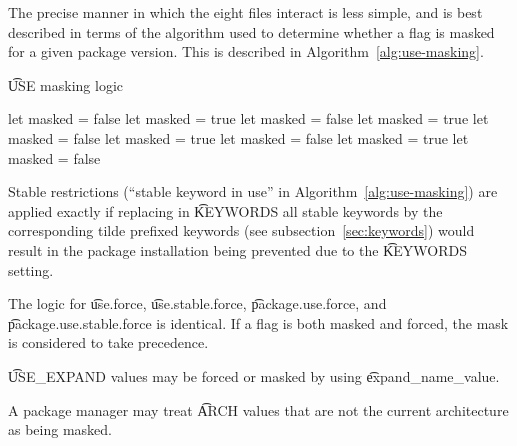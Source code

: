 The precise manner in which the eight files interact is less simple, and is best described in terms
of the algorithm used to determine whether a flag is masked for a given package version. This is
described in Algorithm~\ref{alg:use-masking}.
\begin{algorithm}
\caption{\t{USE} masking logic} \label{alg:use-masking}
\begin{algorithmic}[1]
\STATE let masked = false
        \STATE let masked = true
        \STATE let masked = false
    \ENDIF
            \STATE let masked = true
            \STATE let masked = false
        \ENDIF
    \ENDIF
            \STATE let masked = true
            \STATE let masked = false
        \ENDIF
    \ENDFOR
                \STATE let masked = true
                \STATE let masked = false
            \ENDIF
        \ENDFOR
    \ENDIF
\ENDFOR
\end{algorithmic}
\end{algorithm}

Stable restrictions (``stable keyword in use'' in Algorithm~\ref{alg:use-masking}) are applied
exactly if replacing in \t{KEYWORDS} all stable keywords by the corresponding tilde prefixed
keywords (see subsection~\ref{sec:keywords}) would result in the package installation being
prevented due to the \t{KEYWORDS} setting.

The logic for \t{use.force}, \t{use.stable.force}, \t{package.use.force}, and
\t{package.use.\allowbreak stable.force} is identical. If a flag is both masked and forced, the
mask is considered to take precedence.

\t{USE\_EXPAND} values may be forced or masked by using \t{expand\_name\_value}.

A package manager may treat \t{ARCH} values that are not the current architecture as being masked.




